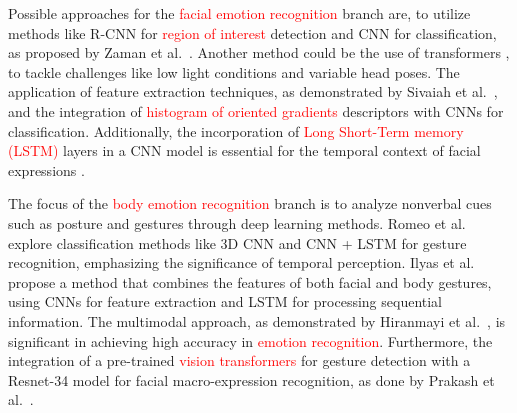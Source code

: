 \documentclass[runningheads]{llncs}
\begin{document}
Possible approaches for the \textcolor{red}{facial emotion recognition} branch are, to utilize methods like R-CNN for \textcolor{red}{region of interest} detection and CNN for classification, as proposed by Zaman et al.~\cite{Zaman2022}. Another method could be the use of transformers \cite{Yao2023}, to tackle challenges like low light conditions and variable head poses. The application of feature extraction techniques, as demonstrated by Sivaiah et al.~\cite{Bellamkonda2020}, and the integration of \textcolor{red}{histogram of oriented gradients} descriptors with CNNs for classification. Additionally, the incorporation of \textcolor{red}{Long Short-Term memory (LSTM)} layers in a CNN model is essential for the temporal context of facial expressions \cite{Mukhiddinov2023}.

The focus of the \textcolor{red}{body emotion recognition} branch is to analyze nonverbal cues such as posture and gestures through deep learning methods. Romeo et al.~\cite{Romeo2021} explore classification methods like 3D CNN and CNN + LSTM for gesture recognition, emphasizing the significance of temporal perception. Ilyas et al.~\cite{Ilyas2021} propose a method that combines the features of both facial and body gestures, using CNNs for feature extraction and LSTM for processing sequential information. The multimodal approach, as demonstrated by Hiranmayi et al.~\cite{Ranganathan2016}, is significant in achieving high accuracy in \textcolor{red}{emotion recognition}. Furthermore, the integration of a pre-trained \textcolor{red}{vision transformers} for gesture detection with a Resnet-34 model for facial macro-expression recognition, as done by Prakash et al.~\cite{Prakash2023}.
\end{document}
